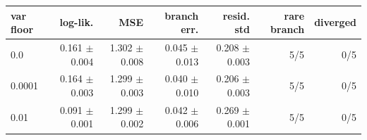 \begin{tabular}{lrrrrrr}
\toprule
var floor & log-lik. & MSE & branch err. & resid. std & rare branch & diverged \\
\midrule
0.0 & 0.161 $\pm$ 0.004 & 1.302 $\pm$ 0.008 & 0.045 $\pm$ 0.013 & 0.208 $\pm$ 0.003 & 5/5 & 0/5 \\
0.0001 & 0.164 $\pm$ 0.003 & 1.299 $\pm$ 0.003 & 0.040 $\pm$ 0.010 & 0.206 $\pm$ 0.003 & 5/5 & 0/5 \\
0.01 & 0.091 $\pm$ 0.001 & 1.299 $\pm$ 0.002 & 0.042 $\pm$ 0.006 & 0.269 $\pm$ 0.001 & 5/5 & 0/5 \\
\bottomrule
\end{tabular}
